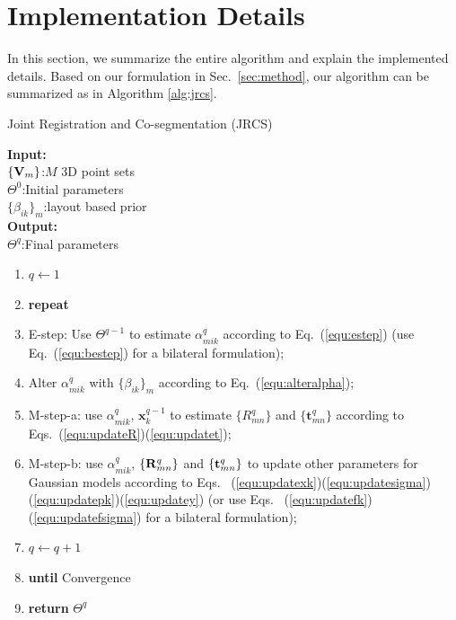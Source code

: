 \section{Implementation Details}
\label{sec:imp}
In this section, we summarize the entire algorithm and explain the implemented details.
%
Based on our formulation in Sec.~\ref{sec:method}, our algorithm can be summarized as in Algorithm \ref{alg:jrcs}.
\begin{algorithm}[htb]
	\caption{Joint Registration and Co-segmentation (JRCS)}
	\label{alg:jrcs}
	\textbf{Input:}~~\\
	$\{\mathbf{V}_m\}$:$M$ 3D point sets\\
	$\Theta^0$:Initial parameters\\
	$\{\beta_{ik}\}_{m}$:layout based prior\\
	\textbf{Output:}~~\\
	$\Theta^q$:Final parameters~~
	\begin{enumerate}
		\item $q\leftarrow1$
		\item \textbf{repeat}
		\item E-step: Use $\Theta^{q-1}$ to estimate $\alpha_{mik}^q$ according to Eq.~(\ref{equ:estep}) (use Eq.~(\ref{equ:bestep}) for a bilateral formulation);
		\item Alter $\alpha_{mik}^q$ with $\{\beta_{ik}\}_{m}$ according to Eq.~(\ref{equ:alteralpha});
		\item M-step-a: use $\alpha^q_{mik}$, $\pmb x^{q-1}_k$ to estimate $\{R_{mn}^q\}$ and $\{\pmb t_{mn}^q\}$ according to Eqs.~(\ref{equ:updateR})(\ref{equ:updatet});
		\item M-step-b: use $\alpha^q_{mik}$, $\{\mathbf{R}_{mn}^q\}$ and $\{\mathbf{t}_{mn}^q\}$ to update other parameters for Gaussian models according to Eqs.~ (\ref{equ:updatexk})(\ref{equ:updatesigma})(\ref{equ:updatepk})(\ref{equ:updatey})  (or use Eqs.~ (\ref{equ:updatefk})(\ref{equ:updatefsigma}) for a bilateral formulation);
		\item $q \leftarrow q+1$
		\item \textbf{until} Convergence 
		\item \textbf{return} $\Theta^q$
	\end{enumerate}
\end{algorithm}
